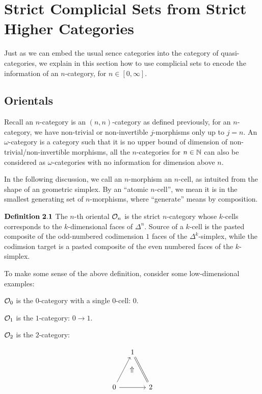 \documentclass[11pt]{article}
\newcommand{\vRightarrow}{\rotatebox[origin=c]{90}{$\Rightarrow$}}
\begin{document}
\section{Strict Complicial Sets from Strict Higher Categories}

Just as we can embed the usual sence categories into the category of quasi-categories, we explain in this section how to use complicial sets to encode the information of an $n$-category, for $n\in [0,\infty]$. 

\subsection{Orientals}

Recall an $n$-category is an $(n,n)$-category as defined previously, for an $n$-category, we have non-trivial or non-invertible $j$-morphisms only up to $j=n$. An $\omega$-category is a category such that it is no upper bound of dimension of non-trivial/non-invertible morphisms, all the $n$-categories for $n\in\Bbb N$ can also be considered as $\omega$-categories with no information for dimension above $n$.

In the following discussion, we call an $n$-morphism an $n$-cell, as intuited from the shape of an geometric simplex. By an ``atomic $n$-cell'', we mean it is in the smallest generating set of $n$-morphisms, where ``generate'' means by composition.

$\bf Definition \ 2.1$ The $n$-th oriental ${\cal O}_{n}$ is the strict $n$-category whose $k$-cells corresponds to the $k$-dimensional faces of $\Delta^n$. Source of a $k$-cell is the pasted composite of the odd-numbered codimension $1$ faces of the $\Delta^k$-simplex, while the codimsion target is a pasted composite of the even numbered faces of the $k$-simplex.

To make some sense of the above definition, consider some low-dimensional examples:

${\cal O}_0$ is the $0$-category with a single $0$-cell: $0$.

${\cal O}_1$ is the $1$-category: $0\to 1$.

${\cal O}_2$ is the $2$-category:


  \begin{equation*}
\begin{tikzcd}[column sep=small, row sep=small]
& 1 \arrow[equal]{rdd}{} \\
& \vRightarrow \\
0 \arrow{uur}{} \arrow{rr}{} &  & 2
\end{tikzcd}
\end{equation*}
\end{document}
